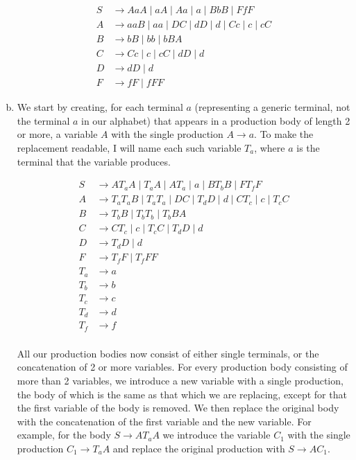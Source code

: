 \documentclass{article}
\begin{document}
\begin{enumerate}[(a)]
        \begin{align*}
            S &\to AaA \mid aA \mid Aa \mid a \mid BbB \mid FfF \\
            A &\to aaB \mid aa \mid DC \mid dD \mid d \mid Cc \mid c \mid cC \\
            B &\to bB \mid bb \mid bBA \\
            C &\to Cc \mid c \mid cC \mid dD \mid d \\
            D &\to dD \mid d \\
            F &\to fF \mid fFF
        \end{align*}

    \item
        We start by creating, for each terminal $a$ (representing a generic terminal, not the terminal $a$ in our alphabet) that appears in a production body of length 2 or more, a variable $A$ with the single production $A \to a$. To make the replacement readable, I will name each such variable $T_a$, where $a$ is the terminal that the variable produces.

        \begin{align*}
            S &\to AT_aA \mid T_aA \mid AT_a \mid a \mid BT_bB \mid FT_fF \\
            A &\to T_aT_aB \mid T_aT_a \mid DC \mid T_dD \mid d \mid CT_c \mid c \mid T_cC \\
            B &\to T_bB \mid T_bT_b \mid T_bBA \\
            C &\to CT_c \mid c \mid T_cC \mid T_dD \mid d \\
            D &\to T_dD \mid d \\
            F &\to T_fF \mid T_fFF \\
            T_a &\to a \\
            T_b &\to b \\
            T_c &\to c \\
            T_d &\to d \\
            T_f &\to f \\
        \end{align*}

        All our production bodies now consist of either single terminals, or the concatenation of 2 or more variables. For every production body consisting of more than 2 variables, we introduce a new variable with a single production, the body of which is the same as that which we are replacing, except for that the first variable of the body is removed. We then replace the original body with the concatenation of the first variable and the new variable. For example, for the body $S \to AT_aA$ we introduce the variable $C_1$ with the single production $C_1 \to T_aA$ and replace the original production with $S \to AC_1$.


\end{enumerate}
\end{document}
